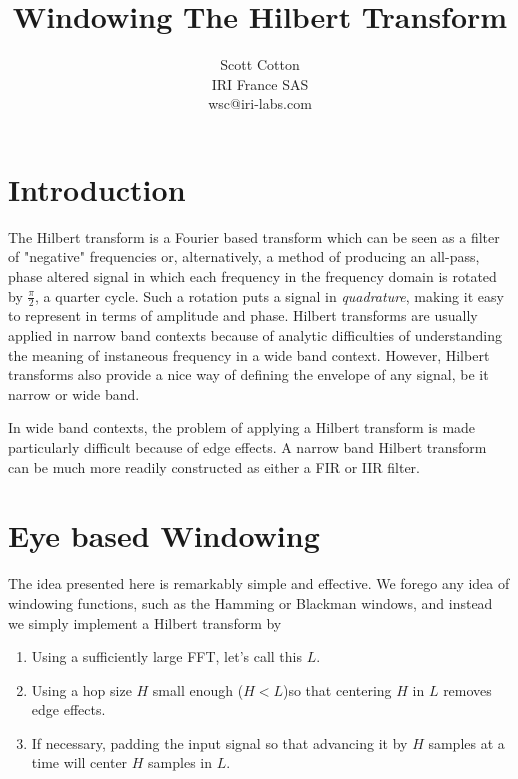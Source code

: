 \documentclass{article}
\author{Scott Cotton\\
IRI France SAS\\
wsc@iri-labs.com}
\title{Windowing The Hilbert Transform}
\begin{document}
\maketitle
{}

\section{Introduction}
The Hilbert transform is a Fourier based transform which can be seen as a 
filter of "negative" frequencies or, alternatively, a method of producing 
an all-pass, phase altered signal in which each frequency in the frequency
domain is rotated by $\frac{\pi}{2}$, a quarter cycle.  Such a rotation 
puts a signal in {\em quadrature}, making it easy to represent in terms of 
amplitude and phase.  Hilbert transforms are usually applied in narrow band
contexts because of analytic difficulties of understanding the meaning of
instaneous frequency in a wide band context.  However, Hilbert transforms also
provide a nice way of defining the envelope of any signal, be it narrow or
wide band.

In wide band contexts, the problem of applying a Hilbert transform is made 
particularly difficult because of edge effects.  A narrow band Hilbert transform
can be much more readily constructed as either a FIR or IIR filter.

\section{Eye based Windowing}
The idea presented here is remarkably simple and effective.  We forego any 
idea of windowing functions, such as the Hamming or Blackman windows, and
instead we simply implement a Hilbert transform by 
\begin{enumerate}
	\item Using a sufficiently large FFT, let's call this $L$.
	\item Using a hop size $H$ small enough ($H < L$)so that centering
		$H$ in $L$ removes edge effects.
	\item If necessary, padding the input signal so that advancing it 
	by $H$ samples at a time will center $H$ samples in $L$.
\end{enumerate}
\end{document}
